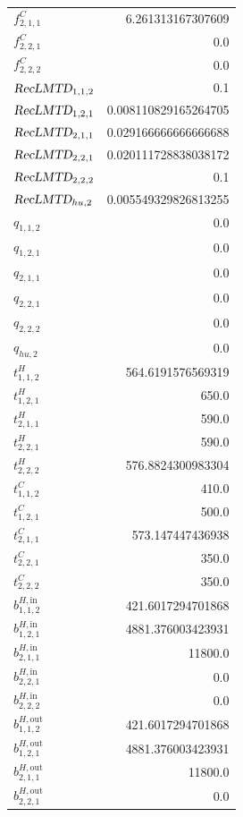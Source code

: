 \documentclass{article}%
\begin{document}
\begin{multicols*}{3}
\begin{supertabular}{lr}
	$f_{2,1,1}^{C}$ & 6.261313167307609 \\%
	$f_{2,2,1}^{C}$ & 0.0 \\%
	$f_{2,2,2}^{C}$ & 0.0 \\%
	$\textsl{RecLMTD}_{1,1,2}$ & 0.1 \\%
	$\textsl{RecLMTD}_{1,2,1}$ & 0.008110829165264705 \\%
	$\textsl{RecLMTD}_{2,1,1}$ & 0.029166666666666688 \\%
	$\textsl{RecLMTD}_{2,2,1}$ & 0.020111728838038172 \\%
	$\textsl{RecLMTD}_{2,2,2}$ & 0.1 \\%
	$\textsl{RecLMTD}_{hu,2}$ & 0.005549329826813255 \\%
	$q_{1,1,2}$ & 0.0 \\%
	$q_{1,2,1}$ & 0.0 \\%
	$q_{2,1,1}$ & 0.0 \\%
	$q_{2,2,1}$ & 0.0 \\%
	$q_{2,2,2}$ & 0.0 \\%
	$q_{hu,2}$ & 0.0 \\%
	$t_{1,1,2}^{H}$ & 564.6191576569319 \\%
	$t_{1,2,1}^{H}$ & 650.0 \\%
	$t_{2,1,1}^{H}$ & 590.0 \\%
	$t_{2,2,1}^{H}$ & 590.0 \\%
	$t_{2,2,2}^{H}$ & 576.8824300983304 \\%
	$t_{1,1,2}^{C}$ & 410.0 \\%
	$t_{1,2,1}^{C}$ & 500.0 \\%
	$t_{2,1,1}^{C}$ & 573.147447436938 \\%
	$t_{2,2,1}^{C}$ & 350.0 \\%
	$t_{2,2,2}^{C}$ & 350.0 \\%
	$b_{1,1,2}^{H,\text{in}}$ & 421.6017294701868 \\%
	$b_{1,2,1}^{H,\text{in}}$ & 4881.376003423931 \\%
	$b_{2,1,1}^{H,\text{in}}$ & 11800.0 \\%
	$b_{2,2,1}^{H,\text{in}}$ & 0.0 \\%
	$b_{2,2,2}^{H,\text{in}}$ & 0.0 \\%
	$b_{1,1,2}^{H,\text{out}}$ & 421.6017294701868 \\%
	$b_{1,2,1}^{H,\text{out}}$ & 4881.376003423931 \\%
	$b_{2,1,1}^{H,\text{out}}$ & 11800.0 \\%
	$b_{2,2,1}^{H,\text{out}}$ & 0.0 \\%

\end{supertabular}
\end{multicols*}
\end{document}
